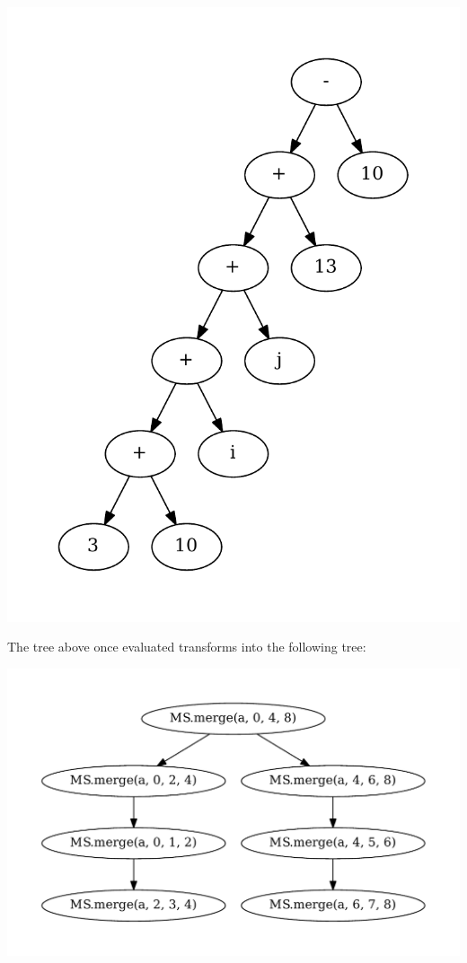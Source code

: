 \begin{center}
\includegraphics[scale=0.5]{graphs/evalTree.pdf}
\end{center}


The tree above once evaluated transforms into the following tree: 

\begin{center}
\includegraphics[scale=0.5]{graphs/fullyEvalTree.pdf}
\end{center}

